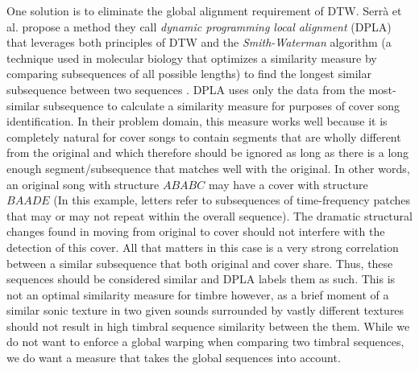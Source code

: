 \documentclass[12pt]{report} 	%
\numberwithin{figure}{chapter}
\numberwithin{table}{chapter}
\numberwithin{equation}{chapter}
\begin{document}
\begin{flushleft}
One solution is to eliminate the global alignment requirement of DTW. Serr\`a et al. propose a method they call \textit{dynamic programming local alignment} (DPLA) that leverages both principles of DTW and the \textit{Smith-Waterman} algorithm (a technique used in molecular biology that optimizes a similarity measure by comparing subsequences of all possible lengths) to find the longest similar subsequence between two sequences \cite{serra2008chroma}. DPLA uses only the data from the most-similar subsequence to calculate a similarity measure for purposes of cover song identification. In their problem domain, this measure works well because it is completely natural for cover songs to contain segments that are wholly different from the original and which therefore should be ignored as long as there is a long enough segment/subsequence that matches well with the original. In other words, an original song with structure $ABABC$ may have a cover with structure $BAADE$ (In this example, letters refer to subsequences of time-frequency patches that may or may not repeat within the overall sequence). The dramatic structural changes found in moving from original to cover should not interfere with the detection of this cover. All that matters in this case is a very strong correlation between a similar subsequence that both original and cover share. Thus, these sequences should be considered similar and DPLA labels them as such. This is not an optimal similarity measure for timbre however, as a brief moment of a similar sonic texture in two given sounds surrounded by vastly different textures should not result in high timbral sequence similarity between the them. While we do not want to enforce a global warping when comparing two timbral sequences, we do want a measure that takes the global sequences into account.


\end{flushleft}
\end{document}
